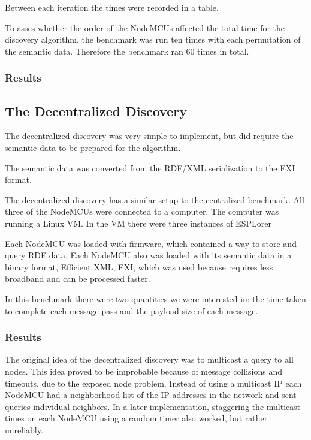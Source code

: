 

Between each iteration the times were recorded in a table. 


To asses whether the order of the NodeMCUs affected the total time for the discovery algorithm, the benchmark was run ten times with each permutation of the semantic data. Therefore the benchmark ran 60 times in total.



\subsubsection{Results}


\subsection{The Decentralized Discovery}
The decentralized discovery was very simple to implement, but did require the semantic data to be prepared for the algorithm.

The semantic data was converted from the RDF/XML serialization to the EXI format.




The decentralized discovery has a similar setup to the centralized benchmark. All three of the NodeMCUs were connected to a computer. The computer was running a Linux VM. In the VM there were three instances of ESPLorer 

Each NodeMCU was loaded with firmware, which contained a way to store and query RDF data. Each NodeMCU also was loaded with its semantic data in a binary format, Efficient XML, EXI, which was used because requires less broadband and can be processed faster. \cite{}  

In this benchmark there were two quantities we were interested in: the time taken to complete each message pass and the payload size of each message.


\subsubsection{Results}
The original idea of the decentralized discovery was to multicast a query to all nodes. This idea proved to be improbable because of message collisions and timeouts, due to the exposed node problem.  Instead of using a multicast IP each NodeMCU had a neighborhood list of the IP addresses in the network and sent queries individual neighbors. In a later implementation, staggering the multicast times on each NodeMCU using a random timer also worked, but rather unreliably. 


